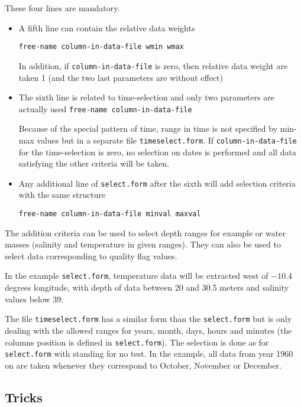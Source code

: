 These four lines are mandatory.


\begin{itemize}
\item

A fifth line can contain the relative data weights

{\tt free-name  column-in-data-file  wmin wmax}

In addition, if {\tt column-in-data-file} is zero, then relative data weight are taken 1 (and the two last parameters are without effect)

\item The sixth line is related to time-selection and only two parameters are actually used
{\tt free-name column-in-data-file}

Because of the special pattern of time, range in time is not specified by min-max values
but in a separate file {\tt timeselect.form}. 
If {\tt column-in-data-file} for the time-selection is zero, no selection on dates is performed and all data satisfying the other criteria will be taken. 

\item 
Any additional line of {\tt select.form} after the sixth will add selection criteria with the same structure

{\tt free-name column-in-data-file minval maxval}

\end{itemize}


The addition criteria can be used to select depth ranges for example or water masses (salinity and temperature in given ranges). They can also be used to select data corresponding to quality flag values.

In the example {\tt select.form}, temperature data will be extracted west of $-10.4$ degrees longitude, with depth
of data between 20 and 30.5 meters and salinity values below 39.

The file {\tt timeselect.form} has a similar form than the {\tt select.form} but is only dealing with the allowed
ranges for years, month, days, hours and minutes (the columns position is defined in {\tt select.form}).
The selection is done as for {\tt select.form} with {\tt *} standing for no test. 
In the example, all data from year 1960 on are taken whenever they correspond to October, November or December.

\subsection{Tricks}

